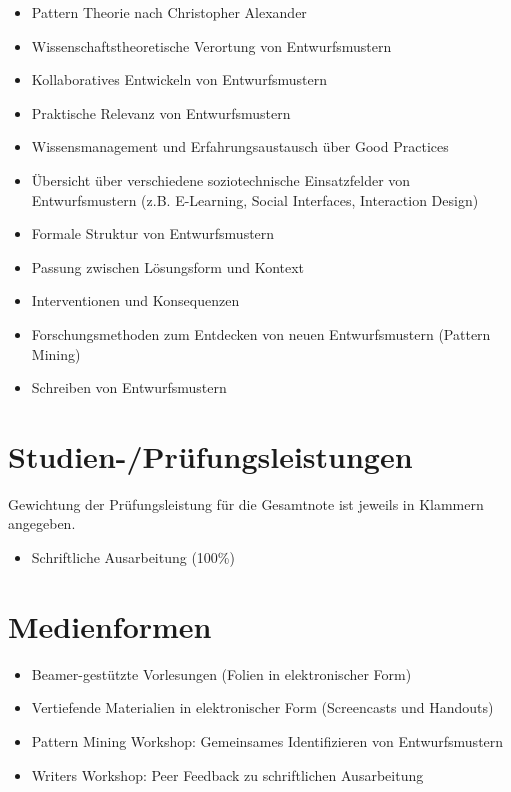 \begin{itemize}
\tightlist
\item
  Pattern Theorie nach Christopher Alexander
\item
  Wissenschaftstheoretische Verortung von Entwurfsmustern
\item
  Kollaboratives Entwickeln von Entwurfsmustern
\item
  Praktische Relevanz von Entwurfsmustern
\item
  Wissensmanagement und Erfahrungsaustausch über Good Practices
\item
  Übersicht über verschiedene soziotechnische Einsatzfelder von
  Entwurfsmustern (z.B. E-Learning, Social Interfaces, Interaction
  Design)
\item
  Formale Struktur von Entwurfsmustern
\item
  Passung zwischen Lösungsform und Kontext
\item
  Interventionen und Konsequenzen
\item
  Forschungsmethoden zum Entdecken von neuen Entwurfsmustern (Pattern
  Mining)
\item
  Schreiben von Entwurfsmustern
\end{itemize}

\section*{Studien-/Prüfungsleistungen\label{/mi-2017/modulbeschreibungen-master/MA_SC_Soziotechnische_Entwurfsmuster}}\label{studien-pruxfcfungsleistungenpathlabelmi-2017modulbeschreibungen-mastermaux5fscux5fsoziotechnischeux5fentwurfsmuster}

Gewichtung der Prüfungsleistung für die Gesamtnote ist jeweils in
Klammern angegeben.

\begin{itemize}
\tightlist
\item
  Schriftliche Ausarbeitung (100\%)
\end{itemize}

\section*{Medienformen\label{/mi-2017/modulbeschreibungen-master/MA_SC_Soziotechnische_Entwurfsmuster}}\label{medienformenpathlabelmi-2017modulbeschreibungen-mastermaux5fscux5fsoziotechnischeux5fentwurfsmuster}

\begin{itemize}
\tightlist
\item
  Beamer-gestützte Vorlesungen (Folien in elektronischer Form)
\item
  Vertiefende Materialien in elektronischer Form (Screencasts und
  Handouts)
\item
  Pattern Mining Workshop: Gemeinsames Identifizieren von
  Entwurfsmustern
\item
  Writers Workshop: Peer Feedback zu schriftlichen Ausarbeitung
\end{itemize}

